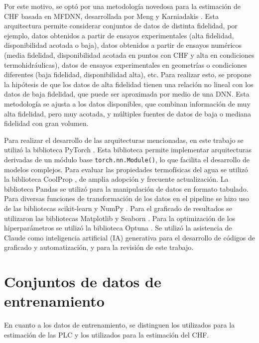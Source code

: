 Por este motivo, se optó por una metodología novedosa para la estimación de CHF basada en MFDNN, desarrollada por Meng y Karniadakis \citep{MENG2020}. Esta arquitectura permite considerar conjuntos de datos de distinta fidelidad, por ejemplo, datos obtenidos a partir de ensayos experimentales (alta fidelidad, disponibilidad acotada o baja), datos obtenidos a partir de ensayos numéricos (media fidelidad, disponibilidad acotada en puntos con CHF y alta en condiciones termohidráulicas), datos de ensayos experimentales en geometrías o condiciones diferentes (baja fidelidad, disponibilidad alta), etc. Para realizar esto, se propone la hipótesis de que los datos de alta fidelidad tienen una relación no lineal con los datos de baja fidelidad, que puede ser aproximada por medio de una DNN. Esta metodología se ajusta a los datos disponibles, que combinan información de muy alta fidelidad, pero muy acotada, y múltiples fuentes de datos de baja o mediana fidelidad con gran volumen.


Para realizar el desarrollo de las arquitecturas mencionadas, en este trabajo se utilizó la biblioteca PyTorch \citep{PYTORCH, PYTORCH_WEBSITE}. Esta biblioteca permite implementar arquitecturas derivadas de un módulo base \lstinline|torch.nn.Module()|, lo que facilita el desarrollo de modelos complejos. 
Para evaluar las propiedades termofísicas del agua se utilizó la biblioteca CoolProp \citep{bell2014coolprop}, de amplia adopción y frecuente actualización.
La biblioteca Pandas \citep{reback2020pandas, mckinney2010} se utilizó para la manipulación de datos en formato tabulado.
Para diversas funciones de transformación de los datos en el pipeline se hizo uso de las bibliotecas scikit-learn \citep{pedregosa2011scikit} y NumPy \citep{harris2020array}.
Para el graficado de resultados se utilizaron las bibliotecas Matplotlib \citep{matplotlib_hunter2007} y Seaborn \citep{seaborn_waskom2021}.
Para la optimización de los hiperparámetros se utilizó la biblioteca Optuna \citep{optuna2019}.
Se utilizó la asistencia de Claude \citep{claude2026} como inteligencia artificial (IA) generativa para el desarrollo de códigos de graficado y automatización, y para la revisión de este trabajo.

\section{Conjuntos de datos de entrenamiento}
\label{sec:datasets}

En cuanto a los datos de entrenamiento, se distinguen los utilizados para la estimación de las PLC y los utilizados para la estimación del CHF.


